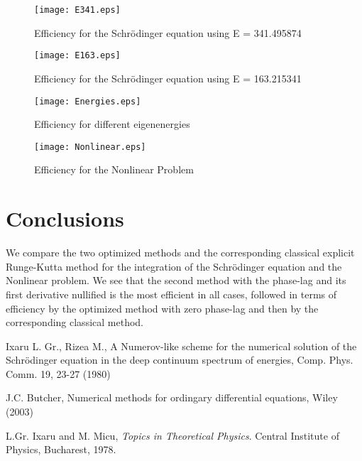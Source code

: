 \documentclass[numreferences]{kluwer}
\begin{document}
\begin{article}
\begin{figure}[tbp]
    \texttt{[image: E341.eps]}
    \caption{Efficiency for the Schr\"odinger equation using E = 341.495874}
    \label{fig_resonance_341}
\end{figure}

\begin{figure}[tbp]
    \texttt{[image: E163.eps]}
    \caption{Efficiency for the Schr\"odinger equation using E = 163.215341}
    \label{fig_resonance_163}
\end{figure}

\begin{figure}[tbp]
    \texttt{[image: Energies.eps]}
    \caption{Efficiency for different eigenenergies}
    \label{fig_energies}
\end{figure}

\begin{figure}[tbp]
    \texttt{[image: Nonlinear.eps]}
    \caption{Efficiency for the Nonlinear Problem}
    \label{fig_nonlinear}
\end{figure}

\section{Conclusions}

We compare the two optimized methods and the corresponding classical explicit Runge-Kutta method for the integration of the Schr\"odinger equation and the Nonlinear problem. We see that the second method with the phase-lag and its first derivative nullified is the most efficient in all cases, followed in terms of efficiency by the optimized method with zero phase-lag and then by the corresponding classical method.

\begin{thebibliography}{120}


 Ixaru L. Gr., Rizea M., A Numerov-like scheme for the numerical solution of the Schr\"{o}dinger equation in the deep continuum spectrum of energies, Comp. Phys. Comm. 19, 23-27 (1980)

 J.C. Butcher, Numerical methods for ordingary differential equations, Wiley (2003)

 L.Gr. Ixaru and M. Micu,
{\it Topics in Theoretical Physics}. Central Institute of Physics,
Bucharest, 1978.


\end{thebibliography}
\end{article}
\end{document}
